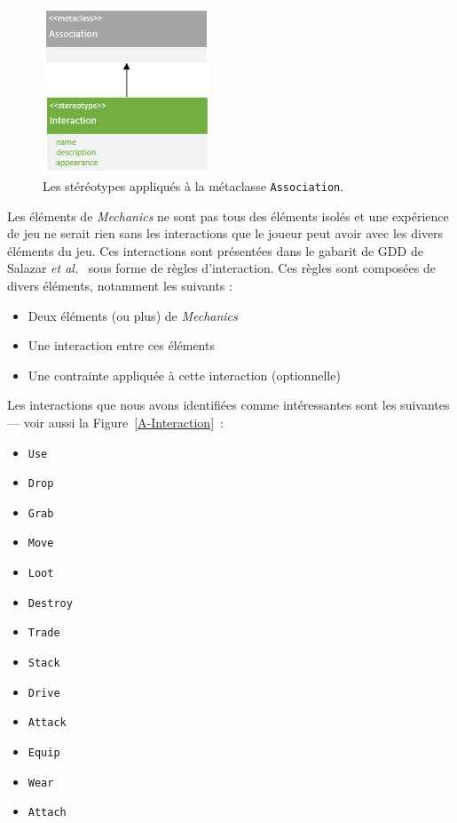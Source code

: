 \begin{figure}[H]
    \centering
    \includegraphics[width=5cm]{10_img/chap5/metaclass_association.PNG} 
    \caption{Les stéréotypes appliqués à la  m\'etaclasse \texttt{Association}.}
    \label{fig.meta_assoc}
\end{figure}
Les éléments de \emph{Mechanics} ne sont pas tous des éléments isolés et une expérience de jeu ne serait rien sans les interactions que le joueur peut avoir avec les divers \'el\'ements du jeu.
Ces interactions sont présentées dans le gabarit de GDD de Salazar \emph{et al.}~\cite{salazar_gdd} sous forme de règles d'interaction.
Ces règles sont composées de divers éléments, notamment les suivants :
\begin{itemize}
    \item Deux \'el\'ements (ou plus) de \emph{Mechanics} 
    \item Une interaction entre ces \'el\'ements
    \item Une contrainte appliquée à cette interaction (optionnelle)
\end{itemize}
Les interactions que nous avons identifi\'ees comme int\'eressantes sont les suivantes --- voir aussi la Figure~\ref{A-Interaction}~:
\begin{itemize}
\item \texttt{Use}
\item \texttt{Drop}
\item \texttt{Grab}
\item \texttt{Move}
\item \texttt{Loot}
\item \texttt{Destroy}
\item \texttt{Trade}
\item \texttt{Stack}
\item \texttt{Drive}
\item \texttt{Attack}
\item \texttt{Equip}
\item \texttt{Wear}
\item \texttt{Attach}

\end{itemize}


